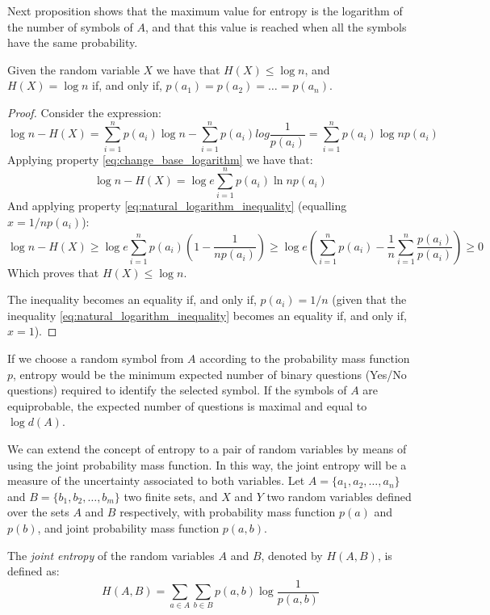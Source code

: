 Next proposition shows that the maximum value for entropy is the logarithm of the number of symbols of $A$, and that this value is reached when all the symbols have the same probability.

\begin{proposition}
\label{prop:maximum_entropy}
Given the random variable $X$ we have that $H(X) \leq \log n$, and $H(X) = \log n$ if, and only if, $p(a_1) = p(a_2) = \ldots = p(a_n)$.
\end{proposition}
\begin{proof}
Consider the expression:
\[
\log n - H(X) = \sum_{i=1}^n p(a_i) \log n - \sum_{i=1}^n p(a_i) log {\frac{1}{p(a_i)}} = \sum_{i=1}^n p(a_i) \log n p(a_i)
\]
Applying property \ref{eq:change_base_logarithm} we have that:
\[
\log n - H(X) = \log e \sum_{i=1}^n p(a_i) \ln n p(a_i)
\]
And applying property \ref{eq:natural_logarithm_inequality} (equalling $x = 1 / n p(a_i)$):
\[
\log n - H(X) \geq \log e \sum_{i=1}^n p(a_i) \left( 1 - \frac{1}{n p(a_i)} \right) \geq \log e \left( \sum_{i=1}^n p(a_i) - \frac{1}{n} \sum_{i=1}^n \frac{p(a_i)}{p(a_i)} \right) \geq 0
\]
Which proves that $H(X) \leq \log n$.

The inequality becomes an equality if, and only if, $p(a_i) = 1 / n$ (given that the inequality \ref{eq:natural_logarithm_inequality} becomes an equality if, and only if, $x=1$).

\end{proof}

\begin{example}
If we choose a random symbol from $A$ according to the probability mass function $p$, entropy would be the minimum expected number of binary questions (Yes/No questions) required to identify the selected symbol. If the symbols of $A$ are equiprobable, the expected number of questions is maximal and equal to $\log d(A)$.
\end{example}

We can extend the concept of entropy to a pair of random variables by means of using the joint probability mass function. In this way, the joint entropy will be a measure of the uncertainty associated to both variables. Let $A = \{a_1, a_2, \ldots, a_n\}$ and $B = \{b_1, b_2, \dots, b_m\}$ two finite sets, and $X$ and $Y$ two random variables defined over the sets $A$ and $B$ respectively, with probability mass function $p(a)$ and $p(b)$, and joint probability mass function $p(a, b)$.

\begin{definition}
The \emph{joint entropy} of the random variables $A$ and $B$, denoted by $H(A, B)$, is defined as:
\[
H(A, B) = \sum_{a \in A} \sum_{b \in B} p(a, b) \log \frac{1}{p(a, b)}
\]
\end{definition}


